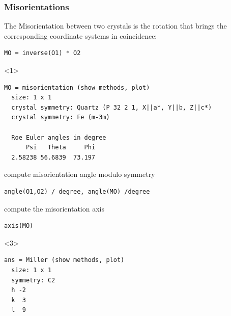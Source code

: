 \begin{frame}[fragile]

  \frametitle{Misorientations}

  The \alert{Misorientation} between two crystals is the rotation that brings
  the corresponding coordinate systems in coincidence:

\begin{lstlisting}
MO = inverse(O1) * O2
\end{lstlisting}

\begin{onlyenv}<1>
\begin{lstlisting}[style=output]
MO = misorientation (show methods, plot)
  size: 1 x 1
  crystal symmetry: Quartz (P 32 2 1, X||a*, Y||b, Z||c*)
  crystal symmetry: Fe (m-3m)

  Roe Euler angles in degree
      Psi   Theta     Phi
  2.58238 56.6839  73.197
\end{lstlisting}
\end{onlyenv}


  \pause
  \medskip

  compute misorientation angle modulo symmetry
\begin{lstlisting}
angle(O1,O2) / degree, angle(MO) /degree
\end{lstlisting}

  \pause
  \medskip

  compute the misorientation axis
\begin{lstlisting}
axis(MO)
\end{lstlisting}

  \begin{onlyenv}<3>
\begin{lstlisting}[style=output]
ans = Miller (show methods, plot)
  size: 1 x 1
  symmetry: C2
  h -2
  k  3
  l  9
\end{lstlisting}
  \end{onlyenv}


\end{frame}



